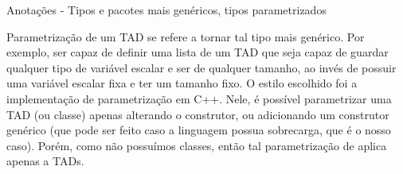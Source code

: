 Anotações
- Tipos e pacotes mais genéricos, tipos parametrizados

Parametrização de um TAD se refere a tornar tal tipo mais genérico. Por exemplo, ser capaz de definir uma lista de um TAD que seja capaz de guardar qualquer tipo de variável escalar e ser de qualquer tamanho, ao invés de possuir uma variável escalar fixa e ter um tamanho fixo. O estilo escolhido foi a implementação de parametrização em C++. Nele, é possível parametrizar uma TAD (ou classe) apenas alterando o construtor, ou adicionando um construtor genérico (que pode ser feito caso a linguagem possua sobrecarga, que é o nosso caso). Porém, como não possuímos classes, então tal parametrização de aplica apenas a TADs.